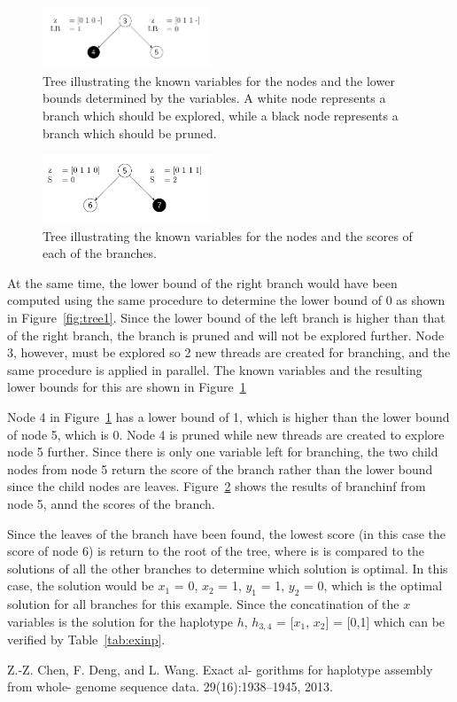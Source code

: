 \documentclass[10pt,twocolumn]{article}
\begin{document}
\begin{figure}[t!]
    \centering
    \includegraphics[width=0.45\textwidth]{tree3}
    \caption{Tree illustrating the known variables for the nodes and the lower bounds determined by the
    variables. A white node represents a branch which should be explored, while a black node represents a
branch which should be pruned.}
    \label{fig:tree3}
\end{figure}
\begin{figure}[b!]
    \centering
    \includegraphics[width=0.45\textwidth]{tree5}
    \caption{Tree illustrating the known variables for the nodes and the scores of each of the branches.}
    \label{fig:tree5}
\end{figure}

At the same time, the lower bound of the right branch would have been computed using the same procedure to
determine the lower bound of 0 as shown in Figure~\ref{fig:tree1}.
Since the lower bound of the left branch is higher than that of the right branch, the branch is pruned and
will not be explored further. Node 3, however, must be explored so 2 new threads are created for branching, 
and the same procedure is applied in parallel. The known variables and the resulting lower bounds for
this are shown in Figure~\ref{fig:tree3}

Node 4 in Figure~\ref{fig:tree3} has a lower bound of 1, which is higher than the lower bound of node 5, which
is 0. Node 4 is pruned while new threads are created to explore node 5 further. Since there is only one
variable left for branching, the two child nodes from node 5 return the score of the branch rather than the lower
bound since the child nodes are leaves. Figure~\ref{fig:tree5} shows the results of branchinf from node 5,
annd the scores of the branch.

Since the leaves of the branch have been found, the lowest score (in this case the score of node 6) is return
to the root of the tree, where is is compared to the solutions of all the other branches to determine which
solution is optimal. In this case, the solution would be $x_1$ = 0, $x_2$ = 1, $y_1$ = 1, $y_2$ = 0, which is
the optimal solution for all branches for this example. Since the concatination of the $x$ variables is the 
solution for the haplotype $h$, $h_{3,4}$ = [$x_1$, $x_2$] = [0,1] which can be verified by
Table~\ref{tab:exinp}.

\begin{thebibliography}{99}
        Z.-Z. Chen, F. Deng, and L. Wang. Exact al-
        gorithms for haplotype assembly from whole-
        genome sequence data. 29(16):1938–1945, 2013.
\end{thebibliography}
\end{document}
